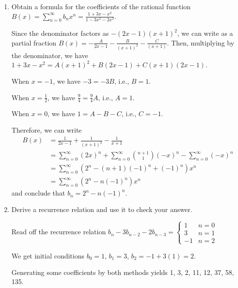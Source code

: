 \begin{xca}\end{xca}
\begin{enumerate}
  \item Obtain a formula for the coefficients of the rational function
        $B(x) = \sum_{n=0}^\infty b_n x^n = \frac{1+3x-x^2}{1-3x^2-2x^3}$.
        \begin{sol}
          Since the denominator factors as $-(2x-1)(x+1)^2$,
          we can write as a partial fraction
          $B(x) = - \frac{A}{2x-1} - \frac{B}{(x+1)^2} - \frac{C}{(x+1)}$.
          Then, multiplying by the denominator,
          we have $1+3x-x^2 = A(x+1)^2 + B(2x-1) + C(x+1)(2x-1)$.

          When $x=-1$, we have $-3 = -3B$, i.e., $B=1$.

          When $x=\frac12$, we have $\frac94 = \frac{9}{4}A$, i.e., $A=1$.

          When $x=0$, we have $1 = A - B - C$, i.e., $C = -1$.

          Therefore, we can write
          \begin{align*}
            B(x) & = \frac{1}{2x-1} + \frac{1}{(x+1)^2} - \frac{1}{x+1}                                          \\
                 & = \sum_{n=0}^\infty (2x)^n + \sum_{n=0}^\infty\binom{n+1}{1}(-x)^n - \sum_{n=0}^\infty (-x)^n \\
                 & = \sum_{n=0}^\infty (2^n - (n+1)(-1)^n + (-1)^n)x^n                                           \\
                 & = \sum_{n=0}^\infty (2^n - n(-1)^n)x^n
          \end{align*}
          and conclude that $b_n = 2^n - n(-1)^n$.
        \end{sol}
  \item Derive a recurrence relation and use it to check your answer.
        \begin{sol}
          Read off the recurrence relation $b_n - 3b_{n-2} - 2b_{n-3} = \begin{cases}
              1  & n = 0 \\
              3  & n = 1 \\
              -1 & n = 2
            \end{cases}$

          We get initial conditions $b_0 = 1$, $b_1 = 3$, $b_2 = -1 + 3(1) = 2$.

          Generating some coefficients by both methods yields
          1, 3, 2, 11, 12, 37, 58, 135.
        \end{sol}
\end{enumerate}

